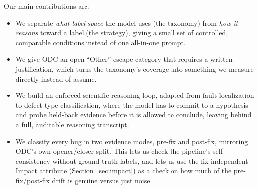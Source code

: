Our main contributions are:
\begin{itemize}
  \item We separate \emph{what label space} the model uses (the taxonomy) from
        \emph{how it reasons} toward a label (the strategy), giving a small set
        of controlled, comparable conditions instead of one all-in-one prompt.
  \item We give ODC an open ``Other'' escape category that requires a written
        justification, which turns the taxonomy's coverage into something we
        measure directly instead of assume.
  \item We build an enforced scientific reasoning loop, adapted from fault
        localization to defect-type classification, where the model has to
        commit to a hypothesis and probe held-back evidence before it is
        allowed to conclude, leaving behind a full, auditable reasoning
        transcript.
  \item We classify every bug in two evidence modes, pre-fix and post-fix,
        mirroring ODC's own opener/closer split. This lets us check the
        pipeline's self-consistency without ground-truth labels, and lets us
        use the fix-independent Impact attribute (Section~\ref{sec:impact}) as
        a check on how much of the pre-fix/post-fix drift is genuine versus
        just noise.
\end{itemize}

